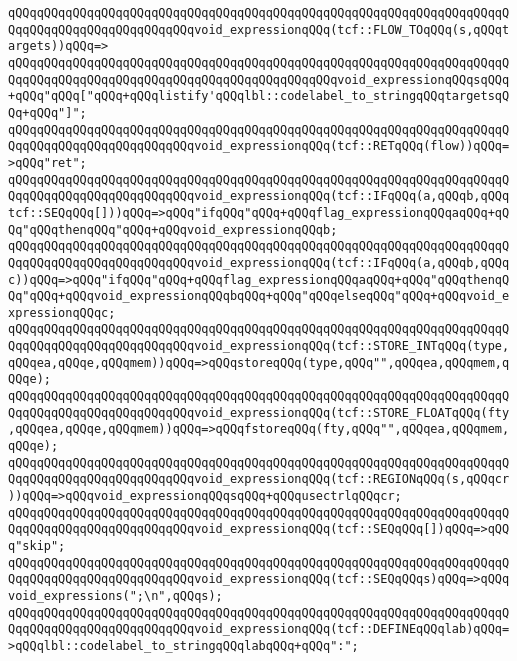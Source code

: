 \verb|qQQqqQQqqQQqqQQqqQQqqQQqqQQqqQQqqQQqqQQqqQQqqQQqqQQqqQQqqQQqqQQqqQQqqQQqqQQqqQQqqQQqqQQqqQQqqQQqvoid_expressionqQQq(tcf::FLOW_TOqQQq(s,qQQqtargets))qQQq=>|\newline
\verb|qQQqqQQqqQQqqQQqqQQqqQQqqQQqqQQqqQQqqQQqqQQqqQQqqQQqqQQqqQQqqQQqqQQqqQQqqQQqqQQqqQQqqQQqqQQqqQQqqQQqqQQqqQQqqQQqqQQqvoid_expressionqQQqsqQQq+qQQq"qQQq["qQQq+qQQqlistify'qQQqlbl::codelabel_to_stringqQQqtargetsqQQq+qQQq"]";|\newline
\verb|qQQqqQQqqQQqqQQqqQQqqQQqqQQqqQQqqQQqqQQqqQQqqQQqqQQqqQQqqQQqqQQqqQQqqQQqqQQqqQQqqQQqqQQqqQQqqQQqvoid_expressionqQQq(tcf::RETqQQq(flow))qQQq=>qQQq"ret";|\newline
\verb|qQQqqQQqqQQqqQQqqQQqqQQqqQQqqQQqqQQqqQQqqQQqqQQqqQQqqQQqqQQqqQQqqQQqqQQqqQQqqQQqqQQqqQQqqQQqqQQqvoid_expressionqQQq(tcf::IFqQQq(a,qQQqb,qQQqtcf::SEQqQQq[]))qQQq=>qQQq"ifqQQq"qQQq+qQQqflag_expressionqQQqaqQQq+qQQq"qQQqthenqQQq"qQQq+qQQqvoid_expressionqQQqb;|\newline
\verb|qQQqqQQqqQQqqQQqqQQqqQQqqQQqqQQqqQQqqQQqqQQqqQQqqQQqqQQqqQQqqQQqqQQqqQQqqQQqqQQqqQQqqQQqqQQqqQQqvoid_expressionqQQq(tcf::IFqQQq(a,qQQqb,qQQqc))qQQq=>qQQq"ifqQQq"qQQq+qQQqflag_expressionqQQqaqQQq+qQQq"qQQqthenqQQq"qQQq+qQQqvoid_expressionqQQqbqQQq+qQQq"qQQqelseqQQq"qQQq+qQQqvoid_expressionqQQqc;|\newline
\verb|qQQqqQQqqQQqqQQqqQQqqQQqqQQqqQQqqQQqqQQqqQQqqQQqqQQqqQQqqQQqqQQqqQQqqQQqqQQqqQQqqQQqqQQqqQQqqQQqvoid_expressionqQQq(tcf::STORE_INTqQQq(type,qQQqea,qQQqe,qQQqmem))qQQq=>qQQqstoreqQQq(type,qQQq"",qQQqea,qQQqmem,qQQqe);|\newline
\verb|qQQqqQQqqQQqqQQqqQQqqQQqqQQqqQQqqQQqqQQqqQQqqQQqqQQqqQQqqQQqqQQqqQQqqQQqqQQqqQQqqQQqqQQqqQQqqQQqvoid_expressionqQQq(tcf::STORE_FLOATqQQq(fty,qQQqea,qQQqe,qQQqmem))qQQq=>qQQqfstoreqQQq(fty,qQQq"",qQQqea,qQQqmem,qQQqe);|\newline
\verb|qQQqqQQqqQQqqQQqqQQqqQQqqQQqqQQqqQQqqQQqqQQqqQQqqQQqqQQqqQQqqQQqqQQqqQQqqQQqqQQqqQQqqQQqqQQqqQQqvoid_expressionqQQq(tcf::REGIONqQQq(s,qQQqcr))qQQq=>qQQqvoid_expressionqQQqsqQQq+qQQqusectrlqQQqcr;|\newline
\verb|qQQqqQQqqQQqqQQqqQQqqQQqqQQqqQQqqQQqqQQqqQQqqQQqqQQqqQQqqQQqqQQqqQQqqQQqqQQqqQQqqQQqqQQqqQQqqQQqvoid_expressionqQQq(tcf::SEQqQQq[])qQQq=>qQQq"skip";|\newline
\verb|qQQqqQQqqQQqqQQqqQQqqQQqqQQqqQQqqQQqqQQqqQQqqQQqqQQqqQQqqQQqqQQqqQQqqQQqqQQqqQQqqQQqqQQqqQQqqQQqvoid_expressionqQQq(tcf::SEQqQQqs)qQQq=>qQQqvoid_expressions(";\n",qQQqs);|\newline
\verb|qQQqqQQqqQQqqQQqqQQqqQQqqQQqqQQqqQQqqQQqqQQqqQQqqQQqqQQqqQQqqQQqqQQqqQQqqQQqqQQqqQQqqQQqqQQqqQQqvoid_expressionqQQq(tcf::DEFINEqQQqlab)qQQq=>qQQqlbl::codelabel_to_stringqQQqlabqQQq+qQQq":";|\newline
